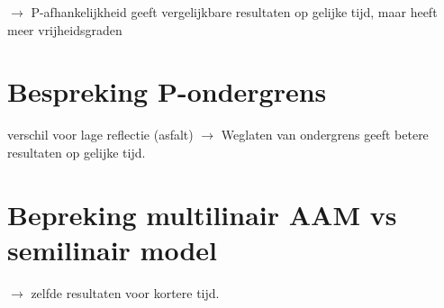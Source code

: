 \documentclass[12pt]{report}
\begin{document}
$\rightarrow$ P-afhankelijkheid geeft vergelijkbare resultaten op gelijke tijd, maar heeft meer vrijheidsgraden

\section{Bespreking P-ondergrens}

verschil voor lage reflectie (asfalt)
$\rightarrow$ Weglaten van ondergrens geeft betere resultaten op gelijke tijd.

\section{Bepreking multilinair AAM vs semilinair model}

$\rightarrow$ zelfde resultaten voor kortere tijd.

\begin{appendices}


\end{appendices}


\begin{flushleft}
\nocite{*}
{}


\end{flushleft}
\end{document}
